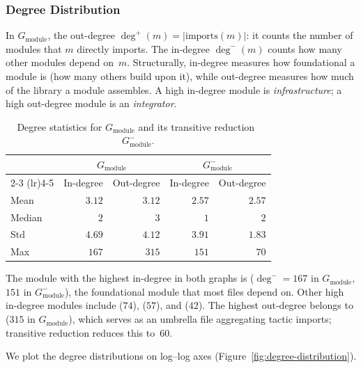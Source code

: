 \label{sec:structural-analysis}
\subsubsection{Degree Distribution}
\label{sec:degree-distribution}
\label{sec:sa-degree}

In $G_{\mathrm{module}}$, the out-degree $\deg^{+}(m) = |\mathrm{imports}(m)|$: it counts the number of modules that $m$ directly imports. The in-degree $\deg^{-}(m)$ counts how many other modules depend on~$m$.
Structurally, in-degree measures how foundational a module is (how many others build upon it), while out-degree measures how much of the library a module assembles. A high in-degree module is \emph{infrastructure}; a high out-degree module is an \emph{integrator}.

\begin{table}[H]
\centering
\caption{Degree statistics for $G_{\mathrm{module}}$ and its transitive reduction~$G_{\mathrm{module}}^{-}$.}
\label{tab:degree-stats}
\begin{tabular}{lrrrr}
\toprule
& \multicolumn{2}{c}{$G_{\mathrm{module}}$} & \multicolumn{2}{c}{$G_{\mathrm{module}}^{-}$} \\
\cmidrule(lr){2-3} \cmidrule(lr){4-5}
& In-degree & Out-degree & In-degree & Out-degree \\
\midrule
Mean   & $3.12$ & $3.12$ & $2.57$ & $2.57$ \\
Median & $2$    & $3$    & $1$    & $2$    \\
Std    & $4.69$ & $4.12$ & $3.91$ & $1.83$ \\
Max    & $167$  & $315$  & $151$  & $70$   \\
\bottomrule
\end{tabular}
\end{table}

The module with the highest in-degree in both graphs is  ($\deg^{-} = 167$ in $G_{\mathrm{module}}$, $151$ in $G_{\mathrm{module}}^{-}$), the foundational module that most files depend on. Other high in-degree modules include  ($74$),  ($57$), and  ($42$). The highest out-degree belongs to  ($315$ in $G_{\mathrm{module}}$), which serves as an umbrella file aggregating tactic imports; transitive reduction reduces this to~$60$.

We plot the degree distributions on log--log axes (Figure~\ref{fig:degree-distribution}).

